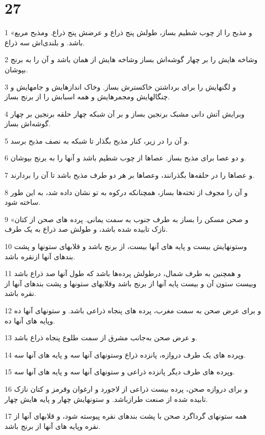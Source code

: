 \chapter{27}

\par 1 «و مذبح را از چوب شطیم بساز، طولش پنج ذراع و عرضش پنج ذراع. ومذبح مربع باشد. و بلندی‌اش سه ذراع.
\par 2 وشاخه هایش را بر چهار گوشه‌اش بساز وشاخه هایش از همان باشد و آن را به برنج بپوشان.
\par 3 و لگنهایش را برای برداشتن خاکسترش بساز. وخاک اندازهایش و جامهایش و چنگالهایش ومجمرهایش و همه اسبابش را از برنج بساز.
\par 4 وبرایش آتش دانی مشبک برنجین بساز و بر آن شبکه چهار حلقه برنجین بر چهار گوشه‌اش بساز.
\par 5 و آن را در زیر، کنار مذبح بگذار تا شبکه به نصف مذبح برسد.
\par 6 و دو عصا برای مذبح بساز. عصاها از چوب شطیم باشد و آنها را به برنج بپوشان.
\par 7 و عصاها را در حلقه‌ها بگذرانند، وعصاها بر هر دو طرف مذبح باشد تا آن را بردارند.
\par 8 و آن را مجوف از تخته‌ها بساز، همچنانکه درکوه به تو نشان داده شد، به این طور ساخته شود.
\par 9 «و صحن مسکن را بساز به طرف جنوب به سمت یمانی. پرده های صحن از کتان نازک تابیده شده باشد، و طولش صد ذراع به یک طرف.
\par 10 وستونهایش بیست و پایه های آنها بیست، از برنج باشد و قلابهای ستونها و پشت بندهای آنها ازنقره باشد.
\par 11 و همچنین به طرف شمال، درطولش پرده‌ها باشد که طول آنها صد ذراع باشد وبیست ستون آن و بیست پایه آنها از برنج باشد وقلابهای ستونها و پشت بندهای آنها از نقره باشد.
\par 12 و برای عرض صحن به سمت مغرب، پرده های پنجاه ذراعی باشد. و ستونهای آنها ده وپایه های آنها ده.
\par 13 و عرض صحن به‌جانب مشرق از سمت طلوع پنجاه ذراع باشد.
\par 14 وپرده های یک طرف دروازه، پانزده ذراع وستونهای آنها سه و پایه های آنها سه.
\par 15 وپرده های طرف دیگر پانزده ذراعی و ستونهای آنها سه و پایه های آنها سه.
\par 16 و برای دروازه صحن، پرده بیست ذراعی از لاجورد و ارغوان وقرمز و کتان نازک تابیده شده از صنعت طرازباشد. و ستونهایش چهار و پایه هایش چهار.
\par 17 همه ستونهای گرداگرد صحن با پشت بندهای نقره پیوسته شود، و قلابهای آنها از نقره وپایه های آنها از برنج باشد.
